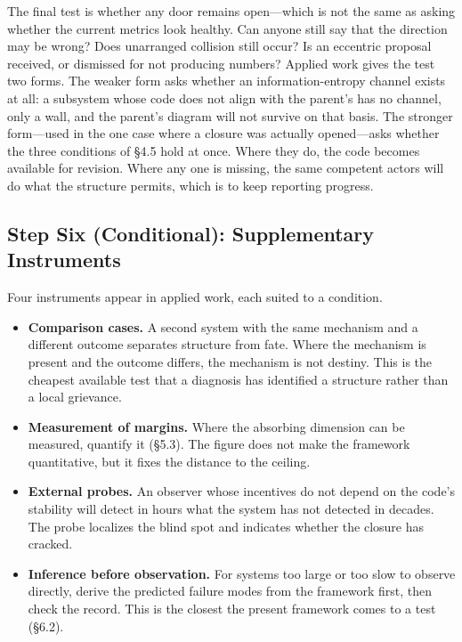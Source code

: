 \documentclass[11pt,a4paper]{article}
\begin{document}
The final test is whether any door remains open---which is not the same as asking whether the current metrics look healthy. Can anyone still say that the direction may be wrong? Does unarranged collision still occur? Is an eccentric proposal received, or dismissed for not producing numbers? Applied work gives the test two forms. The weaker form asks whether an information-entropy channel exists at all: a subsystem whose code does not align with the parent's has no channel, only a wall, and the parent's diagram will not survive on that basis. The stronger form---used in the one case where a closure was actually opened---asks whether the three conditions of \S4.5 hold at once. Where they do, the code becomes available for revision. Where any one is missing, the same competent actors will do what the structure permits, which is to keep reporting progress.

\subsection{Step Six (Conditional): Supplementary Instruments}

Four instruments appear in applied work, each suited to a condition.

\begin{itemize}
    \item \textbf{Comparison cases.} A second system with the same mechanism and a different outcome separates structure from fate. Where the mechanism is present and the outcome differs, the mechanism is not destiny. This is the cheapest available test that a diagnosis has identified a structure rather than a local grievance.
    \item \textbf{Measurement of margins.} Where the absorbing dimension can be measured, quantify it (\S5.3). The figure does not make the framework quantitative, but it fixes the distance to the ceiling.
    \item \textbf{External probes.} An observer whose incentives do not depend on the code's stability will detect in hours what the system has not detected in decades. The probe localizes the blind spot and indicates whether the closure has cracked.
    \item \textbf{Inference before observation.} For systems too large or too slow to observe directly, derive the predicted failure modes from the framework first, then check the record. This is the closest the present framework comes to a test (\S6.2).
\end{itemize}
\end{document}
